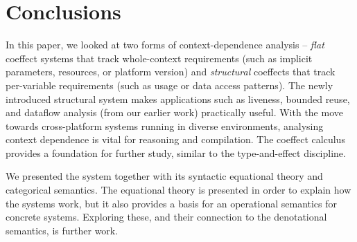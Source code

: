 
\section{Conclusions}

In this paper, we looked at two forms of context-dependence
analysis -- \emph{flat} coeffect systems that track whole-context
requirements (such as implicit parameters, resources, or platform version) and
\emph{structural} coeffects that track per-variable requirements (such
as usage or data access patterns). 
The newly introduced structural system makes applications such as liveness,
bounded reuse, and dataflow analysis (from our earlier work)
practically useful. With the move towards cross-platform systems running in 
diverse environments, analysing context dependence is vital for reasoning and compilation. The coeffect calculus
provides a foundation for further study, similar to the type-and-effect discipline. 

We presented the system together with its syntactic equational theory and categorical semantics.
The equational theory is presented in order to explain how the systems work, but it also
provides a basis for an operational semantics for concrete systems. Exploring these, 
and their connection to the denotational semantics, is further work. 
